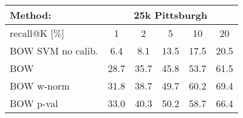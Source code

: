 
	\begin{tabularx}{0.915\linewidth}{|l|c c c c c|}
		\hline 
		\rowcolor{maroon!50}
		Method: & \multicolumn{5}{c|}{25k Pittsburgh} \\
		\hline 
		\hline 
		\rowcolor{maroon!50}
		recall@K [$\%$] & 1 & 2 & 5 & 10 & 20 \\
		\hline
		\rowcolor{maroon!10}
      \rowcolor{maroon!10}
    BOW SVM no calib.   & 6.4   & 8.1   & 13.5  & 17.5  & 20.5 \\
		  \rowcolor{maroon!10}
    BOW           & 28.7  & 35.7  & 45.8 & 53.7   & 61.5 \\
        \rowcolor{maroon!10}
		BOW w-norm  & 31.8    & 38.7  & 49.7  & 60.2  & 69.4 \\
      \rowcolor{maroon!10}
    BOW p-val     & 33.0  & 40.3  & 50.2 & 58.7   &  66.4 \\
    \hline
\end{tabularx}
